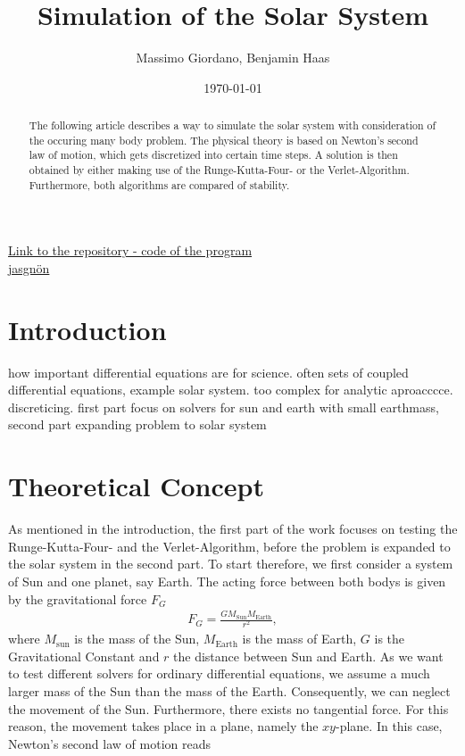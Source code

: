 \documentclass[a4paper]{article}
\title{\textbf{Simulation of the Solar System}}
\author{Massimo Giordano, Benjamin Haas}
\date{\today}
\begin{document}
\maketitle
\begin{center}
\href{https://github.com/massimogiordano/repository/tree/master/restore_SOL/}{Link to the repository - code of the program\\jasgnön}
\end{center}

\begin{abstract}
The following article describes a way to simulate the solar system with consideration of the occuring many body problem. The physical theory is based on Newton's second law of motion, which gets discretized into certain time steps. A solution is then obtained by either making use of the Runge-Kutta-Four- or the Verlet-Algorithm. Furthermore, both algorithms are compared of stability. 
\end{abstract}
\tableofcontents
\pagebreak

\section{Introduction}
how important differential equations are for science. often sets of coupled differential equations, example solar system. too complex for analytic aproacccce. discreticing. first part focus on solvers for sun and earth with small earthmass, second part expanding problem to solar system

\section{Theoretical Concept}
As mentioned in the introduction, the first part of the work focuses on testing the Runge-Kutta-Four- and the Verlet-Algorithm, before the problem is expanded to the solar system in the second part.
\newline
To start therefore, we first consider a system of Sun and one planet, say Earth. The acting force between both bodys is given by the gravitational force $F_G$
\begin{align}
F_G=\frac{GM_{\mathrm{Sun}}M_{\mathrm{Earth}}}{r^2},
\end{align}
where $M_{\mathrm{sun}}$ is the mass of the Sun, $M_{\mathrm{Earth}}$ is the mass of Earth, $G$ is the Gravitational Constant and $r$ the distance between Sun and Earth.
As we want to test different solvers for ordinary differential equations, we assume a much larger mass of the Sun than the mass of the Earth. Consequently, we can neglect the movement of the Sun.
Furthermore, there exists no tangential force. For this reason, the movement takes place in a plane, namely the $xy$-plane. 
In this case, Newton's second law of motion reads
\end{document}
